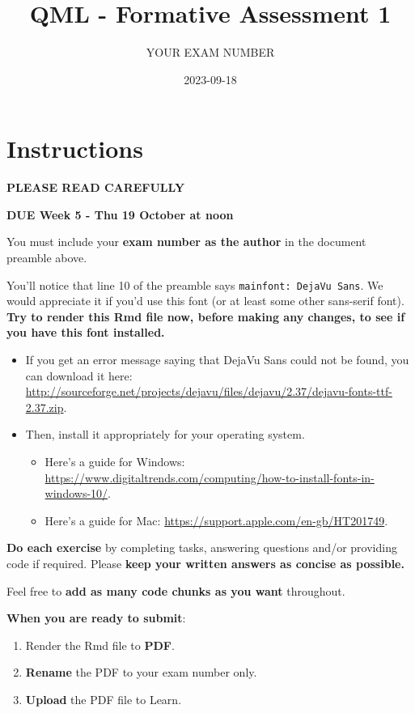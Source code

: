 \documentclass[
]{article}
\title{QML - Formative Assessment 1}
\author{YOUR EXAM NUMBER}
\date{2023-09-18}
\providecommand{\tightlist}{%
  \setlength{\itemsep}{0pt}\setlength{\parskip}{0pt}}
\begin{document}
\maketitle

\section{Instructions}\label{instructions}

\textbf{PLEASE READ CAREFULLY}

\textbf{DUE Week 5 - Thu 19 October at noon}

You must include your \textbf{exam number as the author} in the document
preamble above.

You'll notice that line 10 of the preamble says
\texttt{mainfont:\ DejaVu\ Sans}. We would appreciate it if you'd use
this font (or at least some other sans-serif font). \textbf{Try to
render this Rmd file now, before making any changes, to see if you have
this font installed.}

\begin{itemize}
\tightlist
\item
  If you get an error message saying that DejaVu Sans could not be
  found, you can download it here:
  \url{http://sourceforge.net/projects/dejavu/files/dejavu/2.37/dejavu-fonts-ttf-2.37.zip}.
\item
  Then, install it appropriately for your operating system.

  \begin{itemize}
  \tightlist
  \item
    Here's a guide for Windows:
    \url{https://www.digitaltrends.com/computing/how-to-install-fonts-in-windows-10/}.
  \item
    Here's a guide for Mac:
    \url{https://support.apple.com/en-gb/HT201749}.
  \end{itemize}
\end{itemize}

\textbf{Do each exercise} by completing tasks, answering questions
and/or providing code if required. Please \textbf{keep your written
answers as concise as possible.}

Feel free to \textbf{add as many code chunks as you want} throughout.

\textbf{When you are ready to submit}:

\begin{enumerate}
\def\labelenumi{\arabic{enumi}.}
\tightlist
\item
  Render the Rmd file to \textbf{PDF}.
\item
  \textbf{Rename} the PDF to your exam number only.
\item
  \textbf{Upload} the PDF file to Learn.
\end{enumerate}
\end{document}
